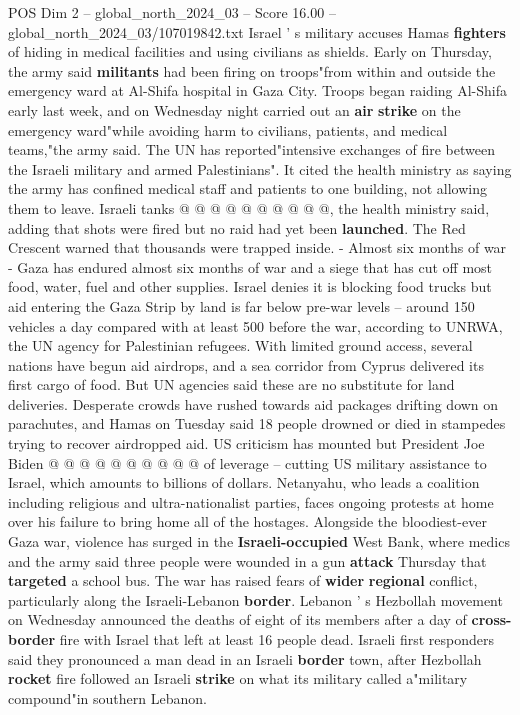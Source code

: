 \begin{textsample}{POS Dim 2 – global\_north\_2024\_03 – Score 16.00 – global\_north\_2024\_03/107019842.txt}
Israel ' s military accuses Hamas \textbf{fighters} of hiding in medical facilities and using civilians as shields.
Early on Thursday, the army said \textbf{militants} had been firing on troops"from within and outside the emergency ward at Al-Shifa hospital in Gaza City.
Troops began raiding Al-Shifa early last week, and on Wednesday night carried out an \textbf{air} \textbf{strike} on the emergency ward"while avoiding harm to civilians, patients, and medical teams,"the army said.
The UN has reported"intensive exchanges of fire between the Israeli military and armed Palestinians".
It cited the health ministry as saying the army has confined medical staff and patients to one building, not allowing them to leave.
Israeli tanks @ @ @ @ @ @ @ @ @ @, the health ministry said, adding that shots were fired but no raid had yet been \textbf{launched}.
The Red Crescent warned that thousands were trapped inside. - Almost six months of war - Gaza has endured almost six months of war and a siege that has cut off most food, water, fuel and other supplies.
Israel denies it is blocking food trucks but aid entering the Gaza Strip by land is far below pre-war levels -- around 150 vehicles a day compared with at least 500 before the war, according to UNRWA, the UN agency for Palestinian refugees.
With limited ground access, several nations have begun aid airdrops, and a sea corridor from Cyprus delivered its first cargo of food.
But UN agencies said these are no substitute for land deliveries.
Desperate crowds have rushed towards aid packages drifting down on parachutes, and Hamas on Tuesday said 18 people drowned or died in stampedes trying to recover airdropped aid.
US criticism has mounted but President Joe Biden @ @ @ @ @ @ @ @ @ @ of leverage -- cutting US military assistance to Israel, which amounts to billions of dollars.
Netanyahu, who leads a coalition including religious and ultra-nationalist parties, faces ongoing protests at home over his failure to bring home all of the hostages.
Alongside the bloodiest-ever Gaza war, violence has surged in the \textbf{Israeli-occupied} West Bank, where medics and the army said three people were wounded in a gun \textbf{attack} Thursday that \textbf{targeted} a school bus.
The war has raised fears of \textbf{wider} \textbf{regional} conflict, particularly along the Israeli-Lebanon \textbf{border}.
Lebanon ' s Hezbollah movement on Wednesday announced the deaths of eight of its members after a day of \textbf{cross-border} fire with Israel that left at least 16 people dead.
Israeli first responders said they pronounced a man dead in an Israeli \textbf{border} town, after Hezbollah \textbf{rocket} fire followed an Israeli \textbf{strike} on what its military called a"military compound"in southern Lebanon.

\end{textsample}
